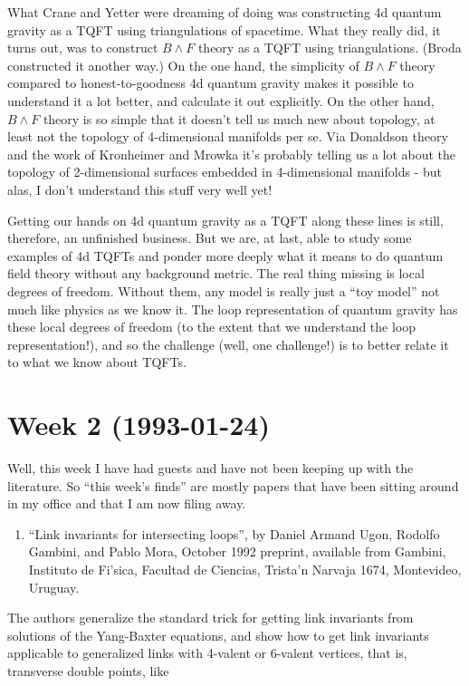 \documentclass{article}
\def\tightlist{}
\begin{document}
What Crane and Yetter were dreaming of doing was constructing 4d quantum
gravity as a TQFT using triangulations of spacetime. What they really
did, it turns out, was to construct \(B\wedge F\) theory as a TQFT using
triangulations. (Broda constructed it another way.) On the one hand, the
simplicity of \(B\wedge F\) theory compared to honest-to-goodness 4d
quantum gravity makes it possible to understand it a lot better, and
calculate it out explicitly. On the other hand, \(B\wedge F\) theory is
so simple that it doesn't tell us much new about topology, at least not
the topology of 4-dimensional manifolds per se. Via Donaldson theory and
the work of Kronheimer and Mrowka it's probably telling us a lot about
the topology of 2-dimensional surfaces embedded in 4-dimensional
manifolds - but alas, I don't understand this stuff very well yet!

Getting our hands on 4d quantum gravity as a TQFT along these lines is
still, therefore, an unfinished business. But we are, at last, able to
study some examples of 4d TQFTs and ponder more deeply what it means to
do quantum field theory without any background metric. The real thing
missing is local degrees of freedom. Without them, any model is really
just a ``toy model'' not much like physics as we know it. The loop
representation of quantum gravity has these local degrees of freedom (to
the extent that we understand the loop representation!), and so the
challenge (well, one challenge!) is to better relate it to what we know
about TQFTs.
\hypertarget{week-2-1993-01-24}{%
\section{Week 2 (1993-01-24)}\label{week-2-1993-01-24}}

Well, this week I have had guests and have not been keeping up with the
literature. So ``this week's finds'' are mostly papers that have been
sitting around in my office and that I am now filing away.

\begin{enumerate}
\def\labelenumi{\arabic{enumi})}
\tightlist
\item
  ``Link invariants for intersecting loops'', by Daniel Armand Ugon,
  Rodolfo Gambini, and Pablo Mora, October 1992 preprint, available from
  Gambini, Instituto de Fi'sica, Facultad de Ciencias, Trista'n Narvaja
  1674, Montevideo, Uruguay.
\end{enumerate}

The authors generalize the standard trick for getting link invariants
from solutions of the Yang-Baxter equations, and show how to get link
invariants applicable to generalized links with 4-valent or 6-valent
vertices, that is, transverse double points, like
\end{document}
